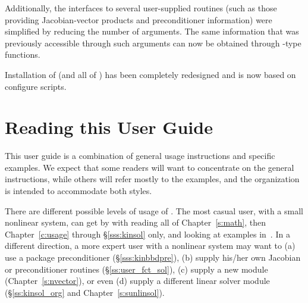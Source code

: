 Additionally, the interfaces to several user-supplied routines
(such as those providing Jacobian-vector products and
preconditioner information) were simplified by reducing the number
of arguments. The same information that was previously accessible
through such arguments can now be obtained through {-type}
functions.

Installation of {\kinsol} (and all of {\sundials}) has been completely
redesigned and is now based on configure scripts.

\section{Reading this User Guide}\label{ss:reading}

This user guide is a combination of general usage instructions and specific
examples. We expect that some readers will want to concentrate on the general
instructions, while others will refer mostly to the examples, and the
organization is intended to accommodate both styles.

There are different possible levels of usage of {\kinsol}. The most casual
user, with a small nonlinear system, can get by with reading all of
Chapter~\ref{s:math}, then Chapter~\ref{c:usage} through \S\ref{sss:kinsol} only, and
looking at examples in~\cite{kinsol_ex}. In a different direction, a
more expert user with a nonlinear system may want to (a) use a package
preconditioner (\S\ref{sss:kinbbdpre}), (b) supply his/her own Jacobian or
preconditioner routines (\S\ref{ss:user_fct_sol}), (c) supply a new
{\nvector} module (Chapter~\ref{s:nvector}), or even (d) supply a different
linear solver module (\S\ref{ss:kinsol_org} and Chapter~\ref{s:sunlinsol}).

